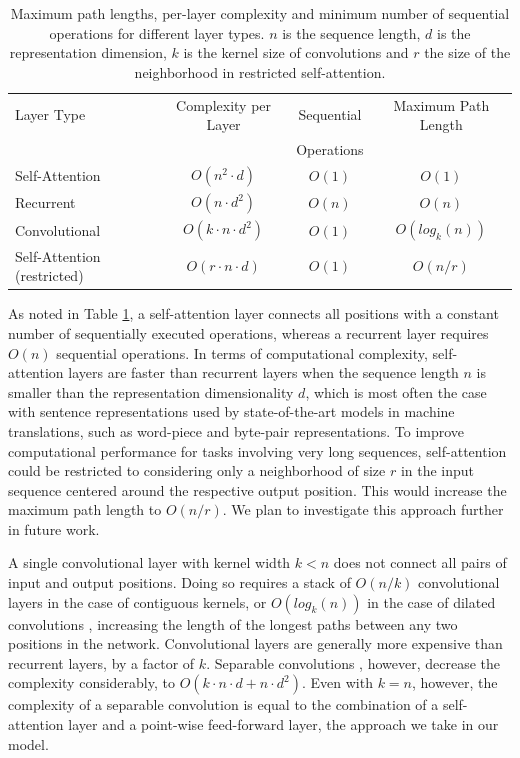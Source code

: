 \documentclass{article}
\begin{document}
\begin{table}[t]
\caption{
  Maximum path lengths, per-layer complexity and minimum number of sequential operations for different layer types. $n$ is the sequence length, $d$ is the representation dimension, $k$ is the kernel size of convolutions and $r$ the size of the neighborhood in restricted self-attention.}
\label{tab:op_complexities}
\begin{center}
\vspace{-1mm}

\begin{tabular}{lccc}
\toprule
Layer Type & Complexity per Layer & Sequential & Maximum Path Length  \\
           &             & Operations &   \\
\hline
\rule{0pt}{2.0ex}Self-Attention & $O(n^2 \cdot d)$ & $O(1)$ & $O(1)$ \\
Recurrent & $O(n \cdot d^2)$ & $O(n)$ & $O(n)$ \\

Convolutional & $O(k \cdot n \cdot d^2)$ & $O(1)$ & $O(log_k(n))$ \\
Self-Attention (restricted)& $O(r \cdot n \cdot d)$ & $O(1)$ & $O(n/r)$ \\

\bottomrule
\end{tabular}
\end{center}
\end{table}

As noted in Table \ref{tab:op_complexities}, a self-attention layer connects all positions with a constant number of sequentially executed operations, whereas a recurrent layer requires $O(n)$ sequential operations.
In terms of computational complexity, self-attention layers are faster than recurrent layers when the sequence length $n$ is smaller than the representation dimensionality $d$, which is most often the case with sentence representations used by state-of-the-art models in machine translations, such as word-piece \citep{wu2016google} and byte-pair \citep{sennrich2015neural} representations.
To improve computational performance for tasks involving very long sequences, self-attention could be restricted to considering only a neighborhood of size $r$ in the input sequence centered around the respective output position. This would increase the maximum path length to $O(n/r)$. We plan to investigate this approach further in future work.

A single convolutional layer with kernel width $k < n$ does not connect all pairs of input and output positions. Doing so requires a stack of $O(n/k)$ convolutional layers in the case of contiguous kernels, or $O(log_k(n))$ in the case of dilated convolutions \citep{NalBytenet2017}, increasing the length of the longest paths between any two positions in the network.
Convolutional layers are generally more expensive than recurrent layers, by a factor of $k$. Separable convolutions \citep{xception2016}, however, decrease the complexity considerably, to $O(k \cdot n \cdot d + n \cdot d^2)$. Even with $k=n$, however, the complexity of a separable convolution is equal to the combination of a self-attention layer and a point-wise feed-forward layer, the approach we take in our model.
\end{document}
